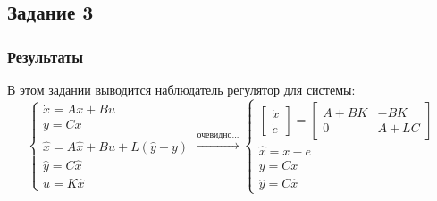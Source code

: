 \subsection{Задание 3}

\subsubsection{Результаты}
В этом задании выводится наблюдатель регулятор для системы:
\[
        \begin{cases}
                \dot{x} = A x + B u\\
                y = C x \\
                \dot{\hat{x}} = A \hat{x} + B u + L(\hat{y} - y) \\
                \hat{y} = C \hat{x} \\
                u = K \hat{x}
        \end{cases} \xrightarrow{\text{очевидно...}}
        \begin{cases}
            \begin{bmatrix} 
                \dot{x} \\
                \dot{e}
            \end{bmatrix} = 
            \begin{bmatrix} 
                A + BK & -BK\\
                0 & A + LC
            \end{bmatrix}\\
            \hat{x} = x - e \\
            y = Cx \\
            \hat{y} = C \hat{x}
         \end{cases}
\]